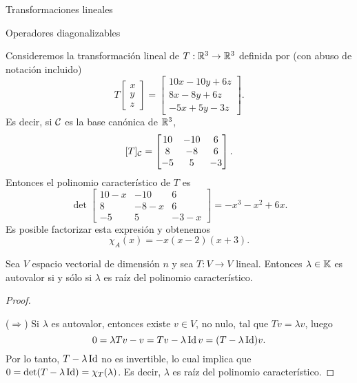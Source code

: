 \begin{chapter}{Transformaciones lineales}
\begin{section}{Operadores diagonalizables}
        
        \begin{ejemplo} \label{ej-autovectores}
            Consideremos la transformación lineal de $T:\mathbb R^3 \to \mathbb R^3$  definida por (con abuso de notación incluido)
            \begin{equation*}
                T
                \begin{bmatrix} x\\y\\z \end{bmatrix} =
                \begin{bmatrix} 10x-10y+6z\\8x -8y +6z \\-5x+5y-3z\end{bmatrix}.
            \end{equation*}
            Es decir,  si $\mathcal{C}$ es la base canónica de $\mathbb R^3$, 
            $$ 
            [T]_{\mathcal{C}}=\begin{bmatrix}10&-10&6\\8& -8& 6\\-5& 5& -3\end{bmatrix}.
            $$
            Entonces el  polinomio característico de $T$ es
            $$
            \det \begin{bmatrix}10-x&-10&6\\8& -8-x& 6\\-5& 5& -3-x\end{bmatrix} = -x^3  - x^2 + 6 x .
            $$
            Es posible factorizar esta expresión y obtenemos
            $$
            \chi_A(x) = -x (x-2)(x+3).
            $$
        \end{ejemplo}
        
        
        \begin{proposicion}\label{autovalores}
            Sea $V$ espacio vectorial de dimensión $n$ y sea $T: V \to V$ lineal. Entonces $\lambda\in \mathbb K$ es autovalor si y sólo si $\lambda$ es raíz del polinomio característico.  
        \end{proposicion}
        \begin{proof}${}^{}$
            
            ($\Rightarrow$) Si $\lambda$ es autovalor, entonces existe $v \in V$, no nulo, tal que $Tv = \lambda v$, luego 
            $$
            0 = \lambda Tv -v  =   Tv - \lambda \operatorname{Id} v =  (T-\lambda \operatorname{Id})v.
            $$
            Por lo tanto, $T-\lambda \operatorname{Id}$ no es invertible, lo cual implica que $0 = \det(T-\lambda \operatorname{Id}) = \chi_T(\lambda)$. Es decir, $\lambda$ es raíz del polinomio característico. 
            

\end{proof}
\end{section}
\end{chapter}
